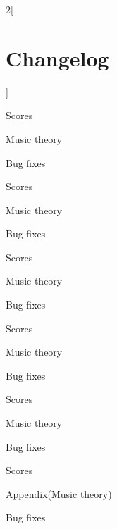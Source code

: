 {\begin{multicols*}{2}[\section*{Changelog}]
\begin{changelog}[author=李小丹, section=false]
\begin{version}[v=2.4-$\beta$(3.141), date=2023-04-02]
	\added
		\item Scores
		\item Music theory
	\fixed
		\item Bug fixes
\end{version}
\begin{version}[v=2.3-$\beta$(3.141), date=2023-03-25]
	\added
		\item Scores
		\item Music theory
	\fixed
		\item Bug fixes
\end{version}
\begin{version}[v=2.2-$\beta$(3.141), date=2023-03-18]
	\added
		\item Scores
		\item Music theory
	\fixed
		\item Bug fixes
\end{version}
\begin{version}[v=2.1-$\beta$(3.141), date=2023-03-11]
	\added
		\item Scores
		\item Music theory
	\fixed
		\item Bug fixes
\end{version}
\begin{version}[v=2.0-$\beta$(3.141), date=2023-03-04, remark="Upload github"]
	\added
		\item Scores
		\item Music theory
	\fixed
		\item Bug fixes
\end{version}
\begin{version}[v=1.5-$\beta$(3.14), date=2023-02-21]
	\added
		\item Scores
		\item Appendix(Music theory)
	\fixed
		\item Bug fixes
\end{version}

\end{changelog}
\end{multicols*}
\pagebreak[4]
}%
